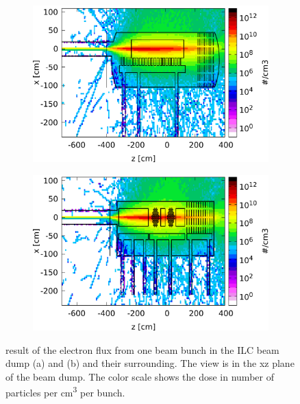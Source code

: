\begin{figure}[!h]
 \centering
  \begin{subfigure}[b]{0.49\textwidth}
   \centering
    \includegraphics[width=\textwidth]{Figures/BeamDump/Electron_flux_xz_Design1.png}
   \caption{\designone}
   \end{subfigure}
   \hfill
    \begin{subfigure}[b]{0.49\textwidth}
   \centering
    \includegraphics[width=\textwidth]{Figures/BeamDump/Electron_flux_xz_Design2.png}
   \caption{\designtwo}
   \end{subfigure}
   \caption[Electron flux in the ILC main beam dump]{\fluka result of the electron flux from one beam bunch in the ILC beam dump \designone (a) and \designtwo (b) and their surrounding.
   The view is in the xz plane of the beam dump.
   The color scale shows the dose in number of particles per \si{\centi\meter\cubed} per bunch.}
   \label{fig:BeamDumps:Electrons}
\end{figure} 

